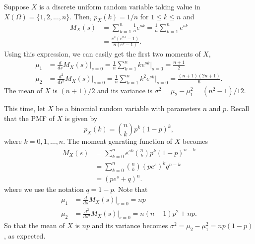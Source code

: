\begin{example}
Suppose $X$ is a discrete uniform random variable taking value in $X(\Omega) = \{ 1, 2, \ldots, n \}$.
Then, $p_X(k) = 1/n$ for $1 \leq k \leq n$ and
\begin{equation*}
\begin{split}
M_X(s) &= \sum_{k = 1}^n \frac{1}{n} e^{sk}
= \frac{1}{n} \sum_{k = 1}^n e^{sk} \\
&= \frac {e^s (e^{ns} - 1)} {n (e^s - 1)} .
\end{split}
\end{equation*}
Using this expression, we can easily get the first two moments of $X$,
\begin{align*}
\mu_1 &= \frac{d}{ds} M_X (s) \Big|_{s = 0}
= \frac{1}{n} \sum_{k = 1}^n k e^{sk} \Big|_{s = 0} = \frac{n + 1}{2} \\
\mu_2 &= \frac{d^2}{ds^2} M_X (s) \Big|_{s=0}
= \frac{1}{n} \sum_{k=1}^n k^2 e^{sk} \Big|_{s = 0}
= \frac {(n + 1)(2n + 1)}{6} .
\end{align*}
The mean of $X$ is $(n+1)/2$ and its variance is $\sigma^2 = \mu_2 - \mu_1^2 = (n^2 - 1)/12$.
\end{example}

\begin{example}
This time, let $X$ be a binomial random variable with parameters $n$ and $p$.
Recall that the PMF of $X$ is given by
\begin{equation*}
p_X(k) = \binom{n}{k} p^k (1 - p)^k,
\end{equation*}
where $k = 0, 1, \ldots, n$.
The moment genrating function of $X$ becomes
\begin{equation*}
\begin{split}
M_X(s) &= \sum_{k = 0}^n e^{sk} \binom{n}{k} p^k (1-p)^{n - k} \\
&= \sum_{k = 0}^n \binom{n}{k} (pe^s)^k q^{n - k} \\
&= (pe^s + q)^n .
\end{split}
\end{equation*}
where we use the notation $q = 1 - p$.
Note that
\begin{align*}
\mu_1 &= \frac{d}{ds} M_X (s) \Big|_{s = 0} = np \\
\mu_2 &= \frac{d^2}{ds^2} M_X (s) \Big|_{s = 0}
= n(n-1)p^2 + np .
\end{align*}
So that the mean of $X$ is $np$ and its variance becomes $\sigma^2 = \mu_2 - \mu_1^2 = np(1 - p)$, as expected.
\end{example}

